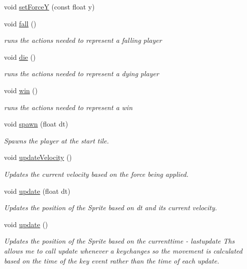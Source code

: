 \begin{DoxyCompactItemize}
void \hyperlink{class_b_player_a94916a0f75042c2e6265fa7c9ec4db32}{set\-Force\-Y} (const float y)
\item 
void \hyperlink{class_b_player_a7981065d2d5b4c581d84cb5b63a15d00}{fall} ()
\begin{DoxyCompactList}\small\item\em runs the actions needed to represent a falling player \end{DoxyCompactList}\item 
void \hyperlink{class_b_player_a5a46736f890786b465bfe51c9c4f8ff7}{die} ()
\begin{DoxyCompactList}\small\item\em runs the actions needed to represent a dying player \end{DoxyCompactList}\item 
void \hyperlink{class_b_player_a479665137e3aad56591b4e16d4cac380}{win} ()
\begin{DoxyCompactList}\small\item\em runs the actions needed to represent a win \end{DoxyCompactList}\item 
void \hyperlink{class_b_player_a1f66cceac56c4252237f6e30003efa4d}{spawn} (float dt)
\begin{DoxyCompactList}\small\item\em \-Spawns the player at the start tile. \end{DoxyCompactList}\item 
void \hyperlink{class_b_player_aa0f9b22686ad0aeec30ea21beb3740f2}{update\-Velocity} ()
\begin{DoxyCompactList}\small\item\em \-Updates the current velocity based on the force being applied. \end{DoxyCompactList}\item 
void \hyperlink{class_b_player_a86f9b0c0d7b4c61ed475f0e70249be7f}{update} (float dt)
\begin{DoxyCompactList}\small\item\em \-Updates the position of the \-Sprite based on dt and its current velocity. \end{DoxyCompactList}\item 
void \hyperlink{class_b_player_a709a36eb859dd8f9a4355e036eac8ac8}{update} ()
\begin{DoxyCompactList}\small\item\em \-Updates the position of the \-Sprite based on the currenttime -\/ lastupdate \-Ths allows me to call update whenever a keychanges so the movement is calculated based on the time of the key event rather than the time of each update. \end{DoxyCompactList}\item 

\end{DoxyCompactItemize}
